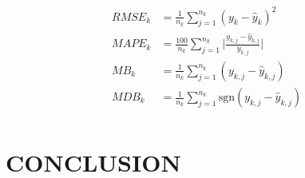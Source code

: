 \begin{equation}
\label{eq:fmetrics}
\begin{split}
	RMSE_k&=\frac{1}{n_k} \sum\limits_{j=1}^{n_k} (y_k-\hat{y}_k)^2 \\
	MAPE_k&=\frac{100}{n_k} \sum\limits_{j=1}^{n_k} \bigg|\frac{y_{k,j}-\hat{y}_{k,j}}{y_{k,j}}\bigg| \\
	MB_k&=\frac{1}{n_k} \sum\limits_{j=1}^{n_k} (y_{k,j}-\hat{y}_{k,j}) \\
	MDB_k&=\frac{1}{n_k} \sum\limits_{j=1}^{n_k} \textrm{sgn}(y_{k,j}-\hat{y}_{k,j})\\
\end{split}
\end{equation}







\section{CONCLUSION}
